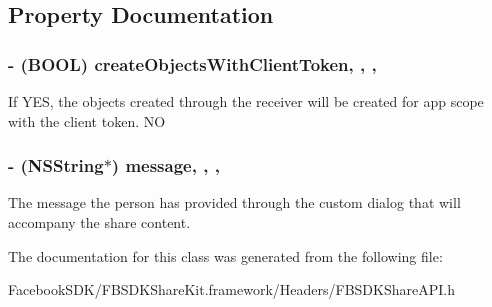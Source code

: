 \subsection{Property Documentation}
\hypertarget{interface_f_b_s_d_k_share_a_p_i_ab0a4e1f4162e1fb2b930b0a6fa235779}{
\subsubsection[{create\-Objects\-With\-Client\-Token}]{\setlength{\rightskip}{0pt plus 5cm}-\/ (B\-O\-O\-L) create\-Objects\-With\-Client\-Token\hspace{0.3cm}{\ttfamily [read]}, {\ttfamily [write]}, {\ttfamily [nonatomic]}, {\ttfamily [assign]}}}\label{interface_f_b_s_d_k_share_a_p_i_ab0a4e1f4162e1fb2b930b0a6fa235779}
If Y\-E\-S, the objects created through the receiver will be created for app scope with the client token.  N\-O \hypertarget{interface_f_b_s_d_k_share_a_p_i_a5ffe34ad98a2a26b3c347600aea194ca}{
\subsubsection[{message}]{\setlength{\rightskip}{0pt plus 5cm}-\/ (N\-S\-String$\ast$) message\hspace{0.3cm}{\ttfamily [read]}, {\ttfamily [write]}, {\ttfamily [nonatomic]}, {\ttfamily [copy]}}}\label{interface_f_b_s_d_k_share_a_p_i_a5ffe34ad98a2a26b3c347600aea194ca}
The message the person has provided through the custom dialog that will accompany the share content. 

The documentation for this class was generated from the following file\-:\begin{DoxyCompactItemize}
\item 
Facebook\-S\-D\-K/\-F\-B\-S\-D\-K\-Share\-Kit.\-framework/\-Headers/F\-B\-S\-D\-K\-Share\-A\-P\-I.\-h\end{DoxyCompactItemize}
